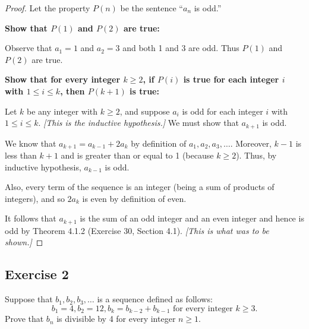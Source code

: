 \documentclass[14pt]{extarticle}
\begin{document}
\begin{proof}
    Let the property $P(n)$ be the sentence “$a_n$ is odd.”

    {\bf Show that $P(1)$ and $P(2)$ are true:}

    Observe that $a_1 = 1$ and $a_2 = 3$ and both 1 and 3 are odd. Thus $P(1)$ and $P(2)$ are true.

        {\bf Show that for every integer $k \geq 2$, if $P(i)$ is true for each integer $i$ with $1 \leq i \leq k$, then $P(k + 1)$ is true:}

    Let $k$ be any integer with $k \geq 2$, and suppose $a_i$ is odd for each integer $i$ with $1 \leq i \leq k$. {\it [This is the inductive hypothesis.]} We must show that $a_{k+1}$ is odd.

    We know that $a_{k+1} = a_{k-1} + 2a_k$ by definition of $a_1, a_2, a_3, \ldots$. Moreover, $k - 1$ is less than $k + 1$ and is greater than or equal to 1 (because $k \geq 2$). Thus, by inductive hypothesis, $a_{k-1}$ is odd.

    Also, every term of the sequence is an integer (being a sum of products of integers), and so $2a_k$ is even by definition of even.

    It follows that $a_{k+1}$ is the sum of an odd integer and an even integer and hence is odd by Theorem 4.1.2 (Exercise 30, Section 4.1). {\it [This is what was to be shown.]}
\end{proof}

\subsection{Exercise 2}
Suppose that $b_1, b_2, b_3, \ldots$ is a sequence defined
as follows:
\[
    b_1 = 4, b_2 = 12, b_k = b_{k-2} + b_{k-1} \text{ for every integer $k \geq 3$.}
\]
Prove that $b_n$ is divisible by 4 for every integer $n \geq 1$.
\end{document}
